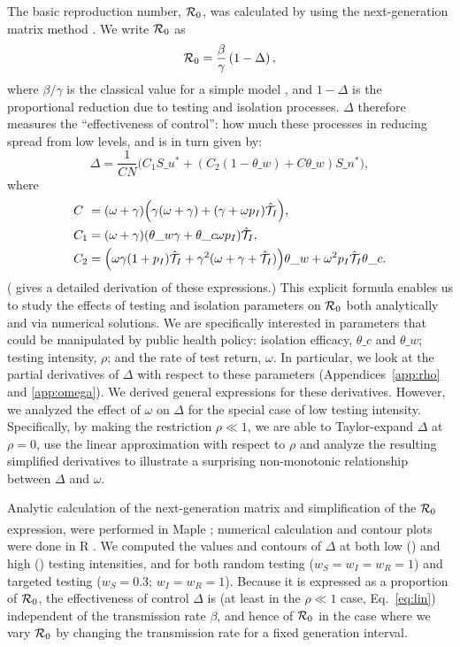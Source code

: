 The basic reproduction number, $\mathcal{R}_0$, was calculated by using the next-generation matrix method \citep{van2002reproduction}. We write $\mathcal{R}_0$ as
\begin{equation}
\label{R0}
\mathcal{R}_0= \frac{\beta}{\gamma} \left(1-\Delta\right), 
\end{equation}
where $\beta/\gamma$ is the classical value for a simple model \citep{keeling2011modeling}, and $1-\Delta$ is the proportional reduction due to testing and isolation processes. $\Delta$ therefore measures the ``effectiveness of control'': how much these processes in reducing spread from low levels, and is in turn given by:
\begin{equation}
  \label{eq:del4a}
  \Delta= \frac{1}{C N}\big(C_1 S\_u^*+(C_2(1-\theta\_w)+C \theta\_w)S\_n^*\big),
\end{equation}
where
\begin{align}
\label{eq:C12}
C_{\phantom 1} &= (\omega+\gamma) \Big(\gamma(\omega+\gamma)+(\gamma+\omega p_I)\testinghat{I}\Big),\\
C_1 &= (\omega+\gamma)(\theta\_w \gamma+\theta\_c \omega p_I) \testinghat{I},\\
C_2 &= \Big( \omega\gamma(1+p_I)\testinghat{I}+\gamma^2(\omega+\gamma+\testinghat{I})\Big)\theta\_w + \omega^2p_I \testinghat{I} \theta\_c.
\end{align}
( gives a detailed derivation of these expressions.)
This explicit formula enables us to study the effects of testing and isolation parameters on $\mathcal{R}_0$ both analytically and via numerical solutions.
We are specifically interested in parameters that could be manipulated by public health policy: isolation efficacy, $\theta\_c$ and $\theta\_w$; \percap testing intensity, $\rho$; and the rate of test return, $\omega$. In particular, we look at the partial derivatives of $\Delta$ with respect to these parameters (Appendices~\ref{app:rho} and \ref{app:omega}). 
We derived general expressions for these derivatives. However, we analyzed the effect of $\omega$ on $\Delta$ for the special case of low testing intensity. Specifically, by making the restriction $\rho \ll 1$, we are able to Taylor-expand $\Delta$ at $\rho=0$, use the linear approximation with respect to $\rho$ and analyze the resulting simplified derivatives to illustrate a surprising non-monotonic relationship between $\Delta$ and $\omega$. 

Analytic calculation of the next-generation matrix and simplification of the $\mathcal{R}_0$ expression, were performed in Maple\textsuperscript{\texttrademark} \citep{maple14}; numerical calculation and contour plots were done in R \citep{r}.
We computed the values and contours of $\Delta$ at both low () and high () testing intensities, and for both random testing ($w_S=w_I=w_R=1$) and targeted testing ($w_S=0.3$; $w_I=w_R=1$). Because it is expressed as a proportion of $\mathcal{R}_0$, the effectiveness of control $\Delta$ is (at least in the $\rho \ll 1$ case, Eq.~\ref{eq:lin}) independent of the transmission rate $\beta$, and hence of $\mathcal{R}_0$ in the case where we vary $\mathcal{R}_0$ by changing the transmission rate for a fixed generation interval.

